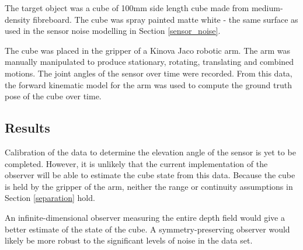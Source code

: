 		The target object was a cube of 100mm side length cube made from medium-density fibreboard. The cube was spray painted matte white - the same surface as used in the sensor noise modelling in Section \ref{sensor_noise}.
		
		The cube was placed in the gripper of a Kinova Jaco robotic arm. The arm was manually manipulated to produce stationary, rotating, translating and combined motions. The joint angles of the sensor over time were recorded. From this data, the forward kinematic model for the arm was used to compute the ground truth pose of the cube over time.		
		
	\subsection{Results}
		Calibration of the data to determine the elevation angle of the sensor is yet to be completed. However, it is unlikely that the current implementation of the observer will be able to estimate the cube state from this data. Because the cube is held by the gripper of the arm, neither the range or continuity assumptions in Section \ref{separation} hold.  
		
		An infinite-dimensional observer measuring the entire depth field would give a better estimate of the state of the cube. A symmetry-preserving observer would likely be more robust to the significant levels of noise in the data set.


